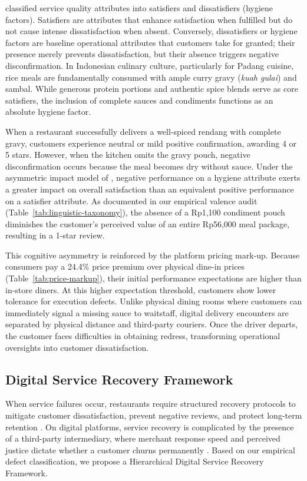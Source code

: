 \documentclass{jomas}
\begin{document}
\textcite{johnston1995determinants} classified service quality attributes into satisfiers and dissatisfiers (hygiene factors). Satisfiers are attributes that enhance satisfaction when fulfilled but do not cause intense dissatisfaction when absent. Conversely, dissatisfiers or hygiene factors are baseline operational attributes that customers take for granted; their presence merely prevents dissatisfaction, but their absence triggers negative disconfirmation. In Indonesian culinary culture, particularly for Padang cuisine, rice meals are fundamentally consumed with ample curry gravy (\textit{kuah gulai}) and sambal. While generous protein portions and authentic spice blends serve as core satisfiers, the inclusion of complete sauces and condiments functions as an absolute hygiene factor. 

When a restaurant successfully delivers a well-spiced rendang with complete gravy, customers experience neutral or mild positive confirmation, awarding 4 or 5 stars. However, when the kitchen omits the gravy pouch, negative disconfirmation occurs because the meal becomes dry without sauce. Under the asymmetric impact model of \textcite{mittal1998asymmetric}, negative performance on a hygiene attribute exerts a greater impact on overall satisfaction than an equivalent positive performance on a satisfier attribute. As documented in our empirical valence audit (Table~\ref{tab:linguistic-taxonomy}), the absence of a Rp1,100 condiment pouch diminishes the customer's perceived value of an entire Rp56,000 meal package, resulting in a 1-star review.

This cognitive asymmetry is reinforced by the platform pricing mark-up. Because consumers pay a 24.4\% price premium over physical dine-in prices (Table~\ref{tab:price-markup}), their initial performance expectations are higher than in-store diners. At this higher expectation threshold, customers show lower tolerance for execution defects. Unlike physical dining rooms where customers can immediately signal a missing sauce to waitstaff, digital delivery encounters are separated by physical distance and third-party couriers. Once the driver departs, the customer faces difficulties in obtaining redress, transforming operational oversights into customer dissatisfaction.

\subsection{Digital Service Recovery Framework}
When service failures occur, restaurants require structured recovery protocols to mitigate customer dissatisfaction, prevent negative reviews, and protect long-term retention \parencite{smith1999servicerecovery,tax1998complaint}. On digital platforms, service recovery is complicated by the presence of a third-party intermediary, where merchant response speed and perceived justice dictate whether a customer churns permanently \parencite{maxham2002longitudinalrecovery,davidow2003responses}. Based on our empirical defect classification, we propose a Hierarchical Digital Service Recovery Framework.
\end{document}
